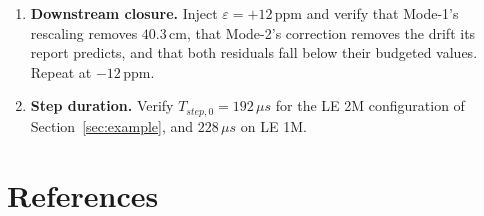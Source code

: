 \documentclass[11pt,a4paper]{article}
\newcommand{\us}{\,\ensuremath{\upmu}s}
\providecommand{\upmu}{\mu}
\begin{document}
\begin{enumerate}[label=\textbf{D\arabic*.},leftmargin=2.6em,itemsep=2pt]
    weights correctly, that a gated step is excluded, and that a channel-correlated spread is flagged
    rather than averaged.
  \item \textbf{Downstream closure.} Inject $\varepsilon=+12$\,ppm and verify that Mode-1's rescaling
    removes $40.3$\,cm, that Mode-2's correction removes the drift its report predicts, and that both
    residuals fall below their budgeted values. Repeat at $-12$\,ppm.
  \item \textbf{Step duration.} Verify $T_{step,0} = 192\us$ for the LE 2M configuration of
    Section~\ref{sec:example}, and $228\us$ on LE 1M.
\end{enumerate}

\clearpage
\section*{References}
\end{document}
